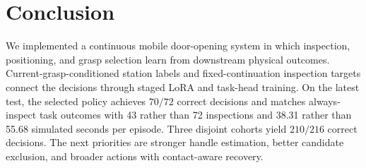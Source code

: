 \section{Conclusion}
\label{sec:conclusion}
We implemented a continuous mobile door-opening system in which inspection,
positioning, and grasp selection learn from downstream physical outcomes.
Current-grasp-conditioned station labels and fixed-continuation inspection
targets connect the decisions through staged LoRA and task-head training.
On the latest test, the selected policy achieves $70/72$
correct decisions and matches always-inspect task outcomes with 43 rather
than 72 inspections and 38.31 rather than 55.68 simulated seconds per episode.
Three disjoint cohorts yield $210/216$ correct decisions. The next priorities
are stronger handle estimation, better candidate exclusion, and broader
actions with contact-aware recovery.
